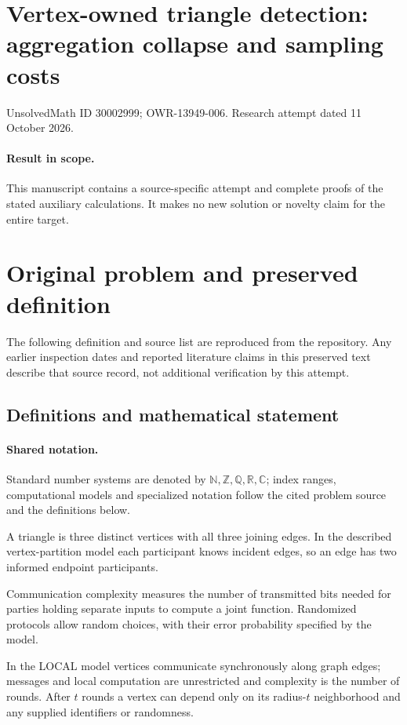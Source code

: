 \documentclass[11pt]{article}
\begin{document}
\section*{Vertex-owned triangle detection: aggregation collapse and sampling costs}
\noindent UnsolvedMath ID 30002999; OWR-13949-006. Research attempt dated 11 October 2026.
\paragraph{Result in scope.}This manuscript contains a source-specific attempt and complete proofs of the stated auxiliary calculations. It makes no new solution or novelty claim for the entire target.
\section{Original problem and preserved definition}
The following definition and source list are reproduced from the repository. Any earlier inspection dates and reported literature claims in this preserved text describe that source record, not additional verification by this attempt.
\subsection{Definitions and mathematical statement}

\paragraph{Shared notation.}Standard number systems are denoted by $\mathbb N,\mathbb Z,\mathbb Q,\mathbb R,\mathbb C$; index ranges, computational models and specialized notation follow the cited problem source and the definitions below.


A triangle is three distinct vertices with all three joining edges. In the described vertex-partition model each participant knows incident edges, so an edge has two informed endpoint participants.

Communication complexity measures the number of transmitted bits needed for parties holding separate inputs to compute a joint function. Randomized protocols allow random choices, with their error probability specified by the model.

In the LOCAL model vertices communicate synchronously along graph edges; messages and local computation are unrestricted and complexity is the number of rounds. After $t$ rounds a vertex can depend only on its radius-$t$ neighborhood and any supplied identifiers or randomness.
\end{document}
